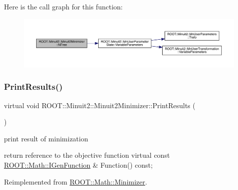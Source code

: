 Here is the call graph for this function\+:
\nopagebreak
\begin{figure}[H]
\begin{center}
\leavevmode
\includegraphics[width=350pt]{d0/d9c/classROOT_1_1Minuit2_1_1Minuit2Minimizer_a0aa136c5a94d1e5c6bfcbfb98da7ad2d_cgraph}
\end{center}
\end{figure}
\mbox{\label{classROOT_1_1Minuit2_1_1Minuit2Minimizer_a0caadc2005eac5d87fc7345bd54decf0}} 
\subsubsection{\texorpdfstring{PrintResults()}{PrintResults()}\hspace{0.1cm}{\footnotesize\ttfamily [1/3]}}
{\footnotesize\ttfamily virtual void R\+O\+O\+T\+::\+Minuit2\+::\+Minuit2\+Minimizer\+::\+Print\+Results (\begin{DoxyParamCaption}{ }\end{DoxyParamCaption})\hspace{0.3cm}{\ttfamily [virtual]}}



print result of minimization 

return reference to the objective function virtual const \mbox{\hyperlink{namespaceROOT_1_1Math_afe6400b4439b79d54c41fb9f5c5af171}{R\+O\+O\+T\+::\+Math\+::\+I\+Gen\+Function}} \& Function() const; 

Reimplemented from \mbox{\hyperlink{classROOT_1_1Math_1_1Minimizer_aea1c5d69c6a1c1f2cf4d17a523862560}{R\+O\+O\+T\+::\+Math\+::\+Minimizer}}.

\mbox{\label{classROOT_1_1Minuit2_1_1Minuit2Minimizer_a0caadc2005eac5d87fc7345bd54decf0}} 
